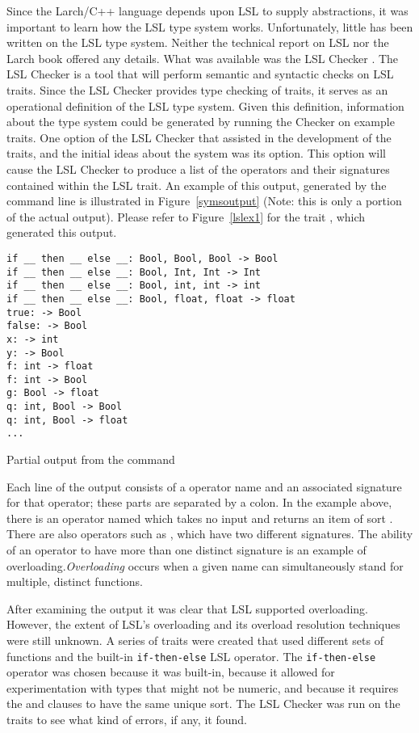 Since the Larch/C++ language depends upon LSL to supply
abstractions, it was important to learn how the LSL type system
works. Unfortunately, little has been written on the LSL type
system. Neither the technical report on LSL
\cite{Guttag-Horning-Modet90} nor the Larch book \cite{Guttag-Horning93}
offered any details. What was available was the LSL Checker
\cite{LSLChecker}. The LSL Checker is a tool that will perform semantic and
syntactic checks on LSL traits. Since the LSL Checker provides type
checking of traits, it serves as an operational definition of the
LSL type system. Given this definition, information about the type
system could be generated by running the Checker on example
traits. One option of the LSL Checker that assisted in the development
of the traits, and the initial ideas about the system was its 
option. This option will cause the LSL Checker to produce a list of
the operators and their signatures contained within the LSL trait. An
example of this output, generated by the command line  is illustrated in Figure~\ref{symsoutput} (Note:
this is only a portion of the actual output). Please refer to
Figure~\ref{lslex1} for the trait , which
generated this output. 
\begin{BFIGURE}
\begin{verbatim}
if __ then __ else __: Bool, Bool, Bool -> Bool
if __ then __ else __: Bool, Int, Int -> Int
if __ then __ else __: Bool, int, int -> int
if __ then __ else __: Bool, float, float -> float
true: -> Bool
false: -> Bool
x: -> int
y: -> Bool
f: int -> float
f: int -> Bool
g: Bool -> float
q: int, Bool -> Bool
q: int, Bool -> float
...
\end{verbatim}
\caption{Partial output from the  command}
\label{symsoutput}
\end{BFIGURE}

Each line of the  output consists of a operator
name and an associated signature for that operator; these parts are separated by a
colon. In the example above, there is an operator named 
which takes no input and returns an item of sort . There
are also operators such as , which have two different
signatures. The ability of an operator to have more than one distinct
signature is an example of overloading.\emph{Overloading} occurs when a
given name can simultaneously stand for multiple, distinct
functions. 

After examining the  output it was clear that LSL
supported overloading. However, the extent of LSL's overloading and its
overload resolution techniques were still unknown. A series of traits
were created that used different sets of functions and the built-in
\texttt{if-then-else} LSL operator. The \texttt{if-then-else} operator
was chosen because it was built-in, because it allowed for
experimentation with types that might not be numeric, and because it
requires the
 and  clauses to have the same unique
sort. The LSL Checker was run on the traits to see what kind of errors,
if any, it found.

